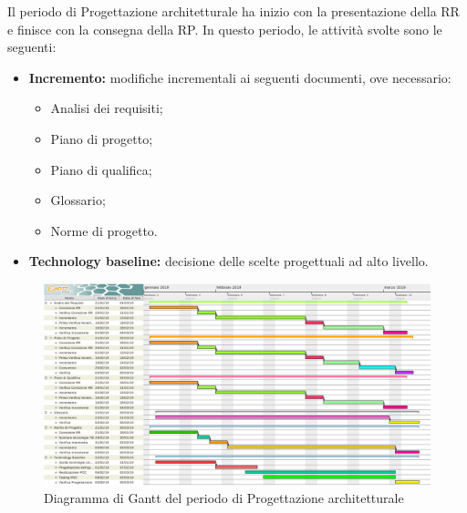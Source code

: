 Il periodo di Progettazione architetturale ha inizio con la presentazione della RR e finisce con la consegna della RP.\newline
In questo periodo, le attività svolte sono le seguenti:
\begin{itemize}
	\item \textbf{Incremento: }modifiche incrementali ai seguenti documenti, ove necessario:
	\begin{itemize}
		\item Analisi dei requisiti;
		\item Piano di progetto;
		\item Piano di qualifica;
		\item Glossario;
		\item Norme di progetto.
	\end{itemize}
	\item \textbf{Technology baseline:} decisione delle scelte progettuali ad alto livello.
\end{itemize}

\begin{figure}[H]
	\begin{center}
		\includegraphics[width=17cm,height=\textheight,keepaspectratio]{Pianificazione/Progettazione.pdf}
	\caption{Diagramma di Gantt del periodo di Progettazione architetturale}
	\end{center}
\end{figure}